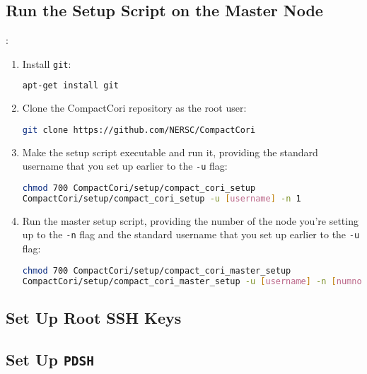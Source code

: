 \documentclass{article}
\begin{document}
    \subsection{Run the Setup Script on the Master Node}:
        \begin{enumerate}
            \item Install \texttt{git}:\\
                \begin{lstlisting}[language=bash]
apt-get install git
                \end{lstlisting}

            \item Clone the CompactCori repository as the root user:\\
                \begin{lstlisting}[language=bash]
git clone https://github.com/NERSC/CompactCori
                \end{lstlisting}
            \item Make the setup script executable and run it, providing the
                standard username that you set up earlier to the \texttt{-u}
                flag:
                \begin{lstlisting}[language=bash]
chmod 700 CompactCori/setup/compact_cori_setup
CompactCori/setup/compact_cori_setup -u [username] -n 1
                \end{lstlisting}
            \item Run the master setup script, providing the number of the node
                you're setting up to the \texttt{-n} flag and the standard
                username that you set up earlier to the \texttt{-u} flag:
                \begin{lstlisting}[language=bash]
chmod 700 CompactCori/setup/compact_cori_master_setup
CompactCori/setup/compact_cori_master_setup -u [username] -n [numnodes]
                \end{lstlisting}
        \end{enumerate}

\subsection{Set Up Root SSH Keys}

\subsection{Set Up \texttt{PDSH}}
\end{document}
